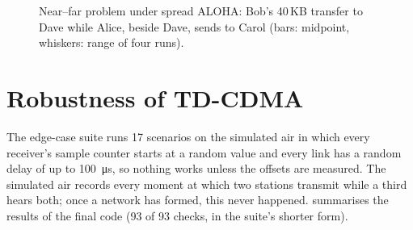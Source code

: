 \documentclass[11pt,a4paper,oneside]{report}
\begin{document}
\begin{figure}[htbp]
\centering
{}
\caption{Near--far problem under spread ALOHA: Bob's 40\,KB transfer to Dave while Alice, beside Dave,
sends to Carol (bars: midpoint, whiskers: range of four runs).}\label{fig:nearfar}
\end{figure}

\section{Robustness of TD-CDMA}
The edge-case suite runs 17 scenarios on the simulated air in which every receiver's sample counter
starts at a random value and every link has a random delay of up to \SI{100}{\micro s}, so nothing works unless
the offsets are measured. The simulated air records every moment at which two stations transmit while a
third hears both; once a network has formed, this never happened.  summarises the
results of the final code (93 of 93 checks, in the suite's shorter form).
\end{document}
